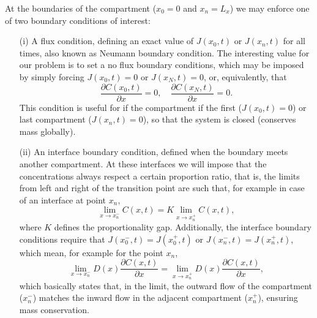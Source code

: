 \documentclass[final,1p,times]{elsarticle}
\begin{document}
At the boundaries of the compartment ($x_0=0$ and $x_n=L_x$) we may enforce one of two boundary conditions of interest:
\begin{enumerate}
\item[(i)] A flux condition, defining an exact value of $J(x_0, t)$ or $J(x_n, t)$ for all times, also known as Neumann boundary condition. The interesting value for our problem is to set a no flux boundary conditions, which may be imposed by simply forcing $J(x_0, t)=0$ or $J(x_N, t)=0$, or, equivalently, that
\begin{equation}
\frac{\partial C(x_0,t)}{\partial x}=0, \quad \frac{\partial C(x_N,t)}{\partial x}=0.
\end{equation}
This condition is useful for if the compartment if the first ($J(x_0, t)=0$) or last compartment ($J(x_n, t)=0$), so that the system is closed (conserves mass globally).
\item[(ii)] An interface boundary condition, defined when the boundary meets another compartment. At these interfaces we will impose that the concentrations always respect a certain proportion ratio, that is, the limits from left and right of the transition point are such that, for example in case of an interface at point $x_n$, 
\begin{equation}
\lim_{x\rightarrow x_n^{-}} C(x, t) = K \lim_{x\rightarrow x_n^{+}} C(x, t),
\end{equation}
where $K$ defines the proportionality gap.
Additionally, the interface boundary conditions require that $J(x_0^-, t)=J(x_0^+, t)$ or  $J(x_n^-, t)=J(x_n^+, t)$, which mean, for example for the point $x_n$,
\begin{equation}
\lim_{x\rightarrow x_n^-}D(x) \frac{\partial C(x,t)}{\partial x} = \lim_{x\rightarrow x_n^+} D(x) \frac{\partial C(x,t)}{\partial x},
\end{equation}
which basically states that, in the limit, the outward flow of the compartment ($x_n^{-}$) matches the inward flow in the adjacent compartment ($x_n^{+}$), ensuring mass conservation.

\end{enumerate}
\end{document}
